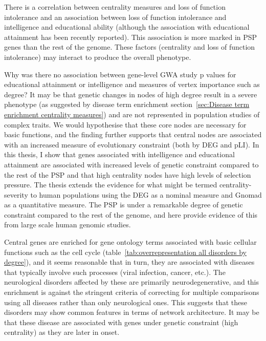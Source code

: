 There is a correlation between centrality measures and loss of function intolerance and an association between loss of function intolerance and intelligence and educational ability (although the association with educational attainment has been recently reported\cite{karczewski2020mutational}). This association is more marked in PSP genes than the rest of the genome. These factors (centrality and loss of function intolerance) may interact to produce the overall phenotype. 

Why was there no association between gene-level GWA study p values for educational attainment or intelligence and measures of vertex importance such as degree? It may be that genetic changes in nodes of high degree result in a severe phenotype (as suggested by disease term enrichment section~\ref{sec:Disease term enrichment centrality measures}) and are not represented in population studies of complex traits. We would hypothesise that these core nodes are necessary for basic functions, and the finding further supports that central nodes are associated with an increased measure of evolutionary constraint (both by DEG and pLI). In this thesis, I show that genes associated with intelligence and educational attainment are associated with increased levels of genetic constraint compared to the rest of the PSP and that high centrality nodes have high levels of selection pressure. The thesis extends the evidence for what might be termed centrality-severity to human populations using the DEG as a nominal measure and Gnomad as a quantitative measure. The PSP is under a remarkable degree of genetic constraint compared to the rest of the genome, and here provide evidence of this from large scale human genomic studies. 


Central genes are enriched for gene ontology terms associated with basic cellular functions such as the cell cycle (table~\ref{tab:overrepresentation all disorders by degree}), and it seems reasonable that in turn, they are associated with diseases that typically involve such processes (viral infection, cancer, etc.). The neurological disorders affected by these are primarily neurodegenerative, and this enrichment is against the stringent criteria of correcting for multiple comparisons using all diseases rather than only neurological ones. This suggests that these disorders may show common features in terms of network architecture. It may be that these disease are associated with genes under genetic constraint (high centrality) as they are later in onset.  


